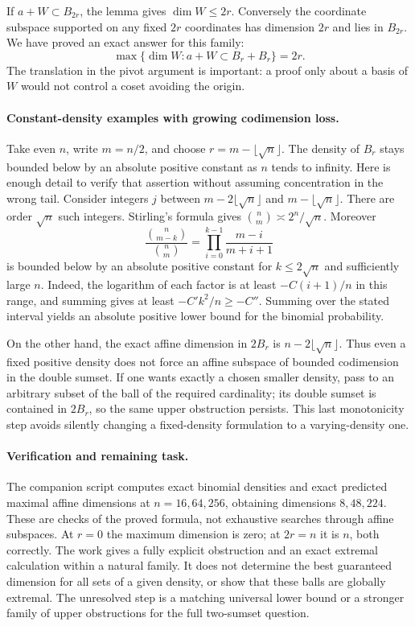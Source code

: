 \documentclass[11pt,a4paper]{article}
\begin{document}
If $a+W\subset B_{2r}$, the lemma gives $\dim W\leq2r$. Conversely the coordinate subspace supported on any fixed $2r$ coordinates has dimension $2r$ and lies in $B_{2r}$. We have proved an exact answer for this family:
\[
 \max\{\dim W:a+W\subset B_r+B_r\}=2r.
\]
The translation in the pivot argument is important: a proof only about a basis of $W$ would not control a coset avoiding the origin.

\paragraph{Constant-density examples with growing codimension loss.}
Take even $n$, write $m=n/2$, and choose $r=m-\lfloor\sqrt n\rfloor$. The density of $B_r$ stays bounded below by an absolute positive constant as $n$ tends to infinity. Here is enough detail to verify that assertion without assuming concentration in the wrong tail. Consider integers $j$ between $m-2\lfloor\sqrt n\rfloor$ and $m-\lfloor\sqrt n\rfloor$. There are order $\sqrt n$ such integers. Stirling's formula gives $\binom n m\asymp2^n/\sqrt n$. Moreover
\[
 \frac{\binom n{m-k}}{\binom n m}
 =\prod_{i=0}^{k-1}\frac{m-i}{m+i+1}
\]
is bounded below by an absolute positive constant for $k\leq2\sqrt n$ and sufficiently large $n$. Indeed, the logarithm of each factor is at least $-C(i+1)/n$ in this range, and summing gives at least $-C'k^2/n\geq-C''$. Summing over the stated interval yields an absolute positive lower bound for the binomial probability.

On the other hand, the exact affine dimension in $2B_r$ is $n-2\lfloor\sqrt n\rfloor$. Thus even a fixed positive density does not force an affine subspace of bounded codimension in the double sumset. If one wants exactly a chosen smaller density, pass to an arbitrary subset of the ball of the required cardinality; its double sumset is contained in $2B_r$, so the same upper obstruction persists. This last monotonicity step avoids silently changing a fixed-density formulation to a varying-density one.

\paragraph{Verification and remaining task.}
The companion script computes exact binomial densities and exact predicted maximal affine dimensions at $n=16,64,256$, obtaining dimensions $8,48,224$. These are checks of the proved formula, not exhaustive searches through affine subspaces. At $r=0$ the maximum dimension is zero; at $2r=n$ it is $n$, both correctly. The work gives a fully explicit obstruction and an exact extremal calculation within a natural family. It does not determine the best guaranteed dimension for all sets of a given density, or show that these balls are globally extremal. The unresolved step is a matching universal lower bound or a stronger family of upper obstructions for the full two-sumset question.
\end{document}
